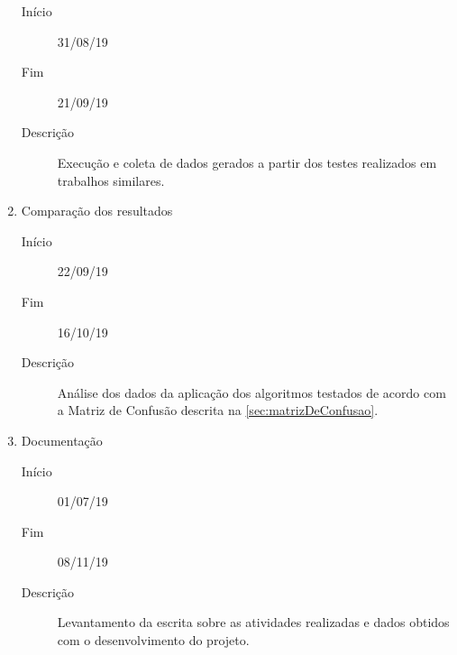 \begin{enumerate}
\begin{description}
        \item[Início] 31/08/19
        \item[Fim] 21/09/19
        \item[Descrição] Execução e coleta de dados gerados a partir dos testes realizados em trabalhos similares.
    \end{description}
   \item Comparação dos resultados
   \begin{description}
        \item[Início] 22/09/19
        \item[Fim] 16/10/19
        \item[Descrição] Análise dos dados da aplicação dos algoritmos testados de acordo com a Matriz de Confusão descrita na \autoref{sec:matrizDeConfusao}.
    \end{description}
   \item Documentação
   \begin{description}
        \item[Início] 01/07/19
        \item[Fim] 08/11/19
        \item[Descrição] Levantamento da escrita sobre as atividades realizadas e dados obtidos com o desenvolvimento do projeto.
    \end{description}
 \end{enumerate}